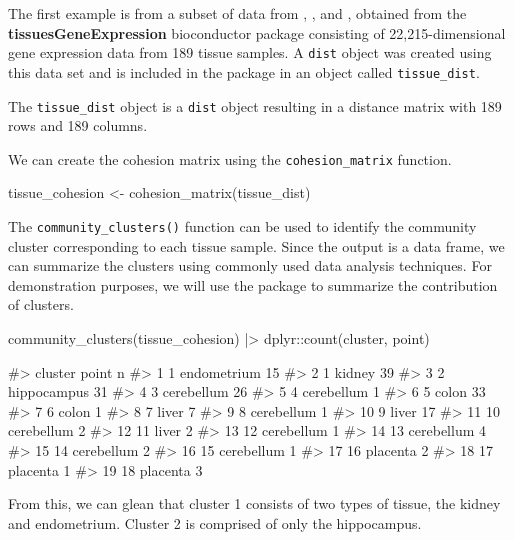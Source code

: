 The first example is from a subset of data from \citet{zilliox2007gene},
\citet{mccall2011gene}, and \citet{mccall2014gene}, obtained from the
\textbf{tissuesGeneExpression} bioconductor package \citep{tissue}
consisting of 22,215-dimensional gene expression data from 189 tissue
samples. A \texttt{dist} object was created using this data set and is
included in the  package in an object called
\texttt{tissue\_dist}.

The \texttt{tissue\_dist} object is a \texttt{dist} object resulting in
a distance matrix with 189 rows and 189 columns.

We can create the cohesion matrix using the \texttt{cohesion\_matrix}
function.

\begin{Schunk}
\begin{Sinput}
tissue_cohesion <- cohesion_matrix(tissue_dist)
\end{Sinput}
\end{Schunk}

The \texttt{community\_clusters()} function can be used to identify the
community cluster corresponding to each tissue sample. Since the output
is a data frame, we can summarize the clusters using commonly used data
analysis techniques. For demonstration purposes, we will use the
 package to summarize the contribution of clusters.

\begin{Schunk}
\begin{Sinput}
community_clusters(tissue_cohesion) |>
  dplyr::count(cluster, point)
\end{Sinput}
\begin{Soutput}
#>    cluster       point  n
#> 1        1 endometrium 15
#> 2        1      kidney 39
#> 3        2 hippocampus 31
#> 4        3  cerebellum 26
#> 5        4  cerebellum  1
#> 6        5       colon 33
#> 7        6       colon  1
#> 8        7       liver  7
#> 9        8  cerebellum  1
#> 10       9       liver 17
#> 11      10  cerebellum  2
#> 12      11       liver  2
#> 13      12  cerebellum  1
#> 14      13  cerebellum  4
#> 15      14  cerebellum  2
#> 16      15  cerebellum  1
#> 17      16    placenta  2
#> 18      17    placenta  1
#> 19      18    placenta  3
\end{Soutput}
\end{Schunk}

From this, we can glean that cluster 1 consists of two types of tissue,
the kidney and endometrium. Cluster 2 is comprised of only the
hippocampus.

